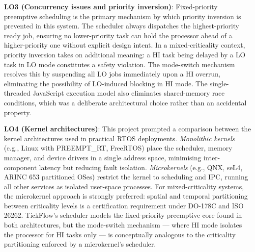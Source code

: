 \documentclass[conference]{IEEEtran}
\begin{document}
\textbf{LO3 (Concurrency issues and priority inversion)}: Fixed-priority preemptive scheduling is the primary mechanism by which priority inversion is prevented in this system. The scheduler always dispatches the highest-priority ready job, ensuring no lower-priority task can hold the processor ahead of a higher-priority one without explicit design intent. In a mixed-criticality context, priority inversion takes on additional meaning: a HI task being delayed by a LO task in LO mode constitutes a safety violation. The mode-switch mechanism resolves this by suspending all LO jobs immediately upon a HI overrun, eliminating the possibility of LO-induced blocking in HI mode. The single-threaded JavaScript execution model also eliminates shared-memory race conditions, which was a deliberate architectural choice rather than an accidental property.

\textbf{LO4 (Kernel architectures)}: This project prompted a comparison between the kernel architectures used in practical RTOS deployments. \textit{Monolithic kernels} (e.g., Linux with PREEMPT\_RT, FreeRTOS) place the scheduler, memory manager, and device drivers in a single address space, minimising inter-component latency but reducing fault isolation. \textit{Microkernels} (e.g., QNX, seL4, ARINC 653 partitioned OSes) restrict the kernel to scheduling and IPC, running all other services as isolated user-space processes. For mixed-criticality systems, the microkernel approach is strongly preferred: spatial and temporal partitioning between criticality levels is a certification requirement under DO-178C and ISO 26262. TickFlow's scheduler models the fixed-priority preemptive core found in both architectures, but the mode-switch mechanism — where HI mode isolates the processor for HI tasks only — is conceptually analogous to the criticality partitioning enforced by a microkernel's scheduler.
\end{document}
